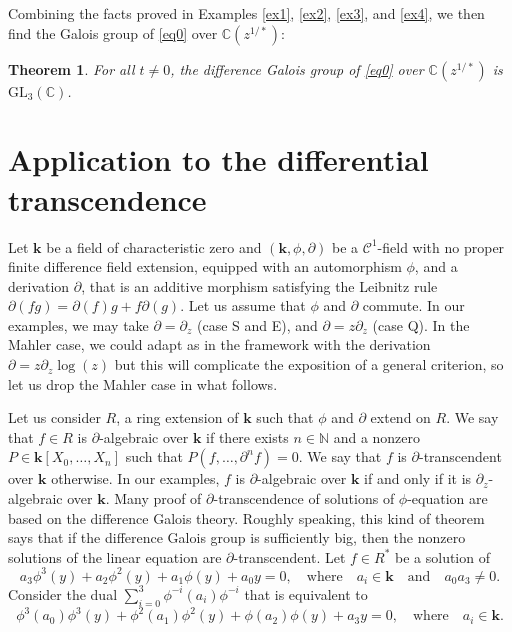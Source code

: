 \documentclass[a4paper,11pt]{amsart}
\newtheorem{thm}{Theorem}[section]
\def\k{\mathbf{k}}
\def\N{\mathbb{N}}
\def\C{\mathbb{C}}
\begin{document}
Combining the facts proved in Examples \ref{ex1},  \ref{ex2},  \ref{ex3}, and  \ref{ex4}, we then find the Galois group of \eqref{eq0} over  $\C(z^{1/*})$:

\begin{thm}\label{thm2}
For all $t\neq 0$, the difference Galois group of \eqref{eq0} over  $\C(z^{1/*})$ is $\mathrm{GL}_3(\C)$.
\end{thm}


\section{Application to the differential transcendence}\label{sec:appliDiffalTranscendence}

Let $\k$ be a field of characteristic zero and $(\k,\phi,\partial)$ be a $\mathcal{C}^1$-field with no proper finite difference field extension,   equipped with an automorphism $\phi$, and a derivation $\partial$, that is an additive morphism satisfying the Leibnitz rule $\partial(fg)=\partial(f)g+f\partial(g)$. Let us assume that $\phi$ and $\partial$ commute.  In our examples, we may take $\partial=\partial_z$ (case S and E),  and $\partial=z \partial_z$ (case Q).  In the Mahler case,  we could adapt as in \cite{dreyfus2018hypertranscendence} the framework with the derivation $\partial= z \partial_z \log(z)$ but this will complicate the exposition of a general criterion, so let us drop the Mahler case in what follows. \par 
Let us consider $R$, a ring extension of $\k$ such that $\phi$ and $\partial$ extend on $R$.  We say that $f\in R$ is $\partial$-algebraic over $\k$ if there exists $n\in\N$ and a nonzero $P\in \k [X_0,\dots, X_n]$ such that $P(f,\dots, \partial^n f)=0$.  We say that $f$ is $\partial$-transcendent over $\k$ otherwise.  In  our examples,  $f$ is $\partial$-algebraic over $\k$ if and only if it is $\partial_z$-algebraic over $\k$.  Many proof of $\partial$-transcendence of solutions of $\phi$-equation are based on the difference Galois theory.  Roughly speaking, this kind of theorem says that if the difference Galois group is sufficiently big, then the nonzero solutions of the linear equation are $\partial$-transcendent.  Let $f\in R^*$ be a solution of 
$$ a_3\phi^3 (y)+ a_2 \phi^2 (y)+a_1 \phi (y)+a_0 y=0, \quad \text{where}\quad  a_i\in \k\quad \text{and}\quad  a_0 a_3 \neq 0.$$
Consider the dual 
$\sum_{i=0}^{3}  \phi^{-i} (a_{i})
\phi^{-i}$ that is equivalent to 
$$ \phi^3(a_0)\phi^3 (y)+ \phi^2(a_1) \phi^2 (y)+\phi(a_2) \phi (y)+a_3 y=0, \quad \text{where}\quad  a_i\in \k.$$
\end{document}
